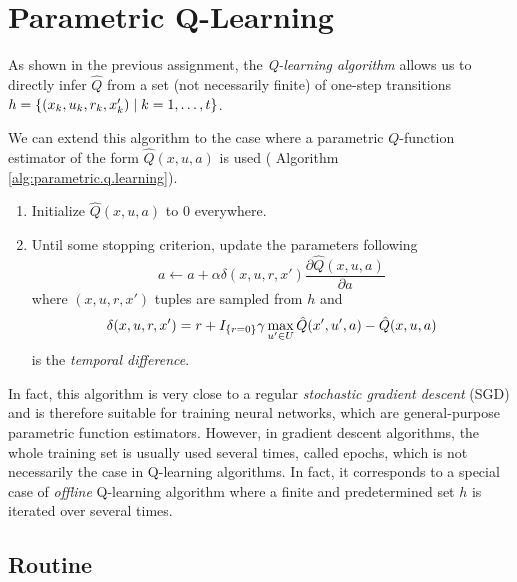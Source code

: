 \documentclass[a4paper, 12pt]{article}
\begin{document}
    \section{Parametric Q-Learning}\label{sec:parametric.q.learning}
    
    As shown in the previous assignment, the \emph{Q-learning algorithm} allows us to directly infer $\hat{Q}$ from a set (not necessarily finite) of one-step transitions $h = \left\{(x_k, u_k, r_k, x'_k) \mid k = 1, \ldots, t\right\}$.
    
    We can \cite{ernstinfo8003} extend this algorithm to the case where a parametric $Q$-function estimator of the form $\hat{Q}(x, u, a)$ is used (\cf{} Algorithm \ref{alg:parametric.q.learning}).
    
    \begin{fmd-algorithm}\label{alg:parametric.q.learning}
        \begin{enumerate}
            \item Initialize $\hat{Q}(x, u, a)$ to $0$ everywhere.
            \item Until some stopping criterion, update the parameters following
            \begin{equation}\label{eq:parametric.update}
                a \gets a + \alpha \delta(x, u, r, x') \frac{\partial \hat{Q}(x, u, a)}{\partial a}
            \end{equation}
            where $(x, u, r, x')$ tuples are sampled from $h$ and
            \begin{equation}
                \delta(x, u, r, x') = r + I_{\left\{r = 0\right\}} \gamma \max_{u' \in U} \hat{Q}(x', u', a) - \hat{Q}(x, u, a)
            \end{equation}
            is the \emph{temporal difference}.
        \end{enumerate}
    \end{fmd-algorithm}
    
    In fact, this algorithm is very close to a regular \emph{stochastic gradient descent} (SGD) and is therefore suitable for training neural networks, which are general-purpose parametric function estimators. However, in gradient descent algorithms, the whole training set is usually used several times, called epochs, which is not necessarily the case in Q-learning algorithms. In fact, it corresponds to a special case of \emph{offline} Q-learning algorithm where a finite and predetermined set $h$ is iterated over several times.
    
    \subsection{Routine}
    
\end{document}
